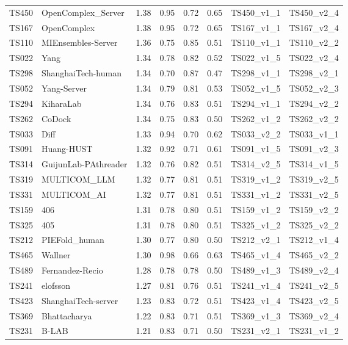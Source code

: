 \begin{longtable}{llllllll}
TS450 & OpenComplex\_Server & 1.38 & 0.95 & 0.72 & 0.65 & TS450\_v1\_1 & TS450\_v2\_4 \\ 
TS167 & OpenComplex & 1.38 & 0.95 & 0.72 & 0.65 & TS167\_v1\_1 & TS167\_v2\_4 \\ 
TS110 & MIEnsembles-Server & 1.36 & 0.75 & 0.85 & 0.51 & TS110\_v1\_1 & TS110\_v2\_2 \\ 
TS022 & Yang & 1.34 & 0.78 & 0.82 & 0.52 & TS022\_v1\_5 & TS022\_v2\_4 \\ 
TS298 & ShanghaiTech-human & 1.34 & 0.70 & 0.87 & 0.47 & TS298\_v1\_1 & TS298\_v2\_1 \\ 
TS052 & Yang-Server & 1.34 & 0.79 & 0.81 & 0.53 & TS052\_v1\_5 & TS052\_v2\_3 \\ 
TS294 & KiharaLab & 1.34 & 0.76 & 0.83 & 0.51 & TS294\_v1\_1 & TS294\_v2\_2 \\ 
TS262 & CoDock & 1.34 & 0.75 & 0.83 & 0.50 & TS262\_v1\_2 & TS262\_v2\_2 \\ 
TS033 & Diff & 1.33 & 0.94 & 0.70 & 0.62 & TS033\_v2\_2 & TS033\_v1\_1 \\ 
TS091 & Huang-HUST & 1.32 & 0.92 & 0.71 & 0.61 & TS091\_v1\_5 & TS091\_v2\_3 \\ 
TS314 & GuijunLab-PAthreader & 1.32 & 0.76 & 0.82 & 0.51 & TS314\_v2\_5 & TS314\_v1\_5 \\ 
TS319 & MULTICOM\_LLM & 1.32 & 0.77 & 0.81 & 0.51 & TS319\_v1\_2 & TS319\_v2\_5 \\ 
TS331 & MULTICOM\_AI & 1.32 & 0.77 & 0.81 & 0.51 & TS331\_v1\_2 & TS331\_v2\_5 \\ 
TS159 & 406 & 1.31 & 0.78 & 0.80 & 0.51 & TS159\_v1\_2 & TS159\_v2\_2 \\ 
TS325 & 405 & 1.31 & 0.78 & 0.80 & 0.51 & TS325\_v1\_2 & TS325\_v2\_2 \\ 
TS212 & PIEFold\_human & 1.30 & 0.77 & 0.80 & 0.50 & TS212\_v2\_1 & TS212\_v1\_4 \\ 
TS465 & Wallner & 1.30 & 0.98 & 0.66 & 0.63 & TS465\_v1\_4 & TS465\_v2\_2 \\ 
TS489 & Fernandez-Recio & 1.28 & 0.78 & 0.78 & 0.50 & TS489\_v1\_3 & TS489\_v2\_4 \\ 
TS241 & elofsson & 1.27 & 0.81 & 0.76 & 0.51 & TS241\_v1\_4 & TS241\_v2\_5 \\ 
TS423 & ShanghaiTech-server & 1.23 & 0.83 & 0.72 & 0.51 & TS423\_v1\_4 & TS423\_v2\_5 \\ 
TS369 & Bhattacharya & 1.22 & 0.83 & 0.71 & 0.51 & TS369\_v1\_3 & TS369\_v2\_4 \\ 
TS231 & B-LAB & 1.21 & 0.83 & 0.71 & 0.50 & TS231\_v2\_1 & TS231\_v1\_2 \\ 

\end{longtable}
